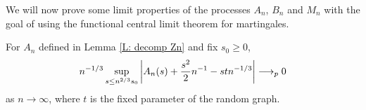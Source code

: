 We will now prove some limit properties of the processes $A_n$, $B_n$ and $M_n$ with the goal of using the functional central limit theorem for martingales.


\begin{lemma} \label{L: limit An}
	For $A_n$ defined in Lemma \ref{L: decomp Zn} and fix $s_0 \geq 0$,
	\begin{equation} \label{E: limit An}
	n^{-1 / 3} \sup_{s \leq n^{2 / 3} s_0 } \left| A_n(s) + \frac{s^2}{2}n^{-1} - stn^{-1 / 3} \right| \longrightarrow_p 0
	\end{equation}
	as $n \rightarrow \infty$, where $t$ is the fixed parameter of the random graph.
\end{lemma}


